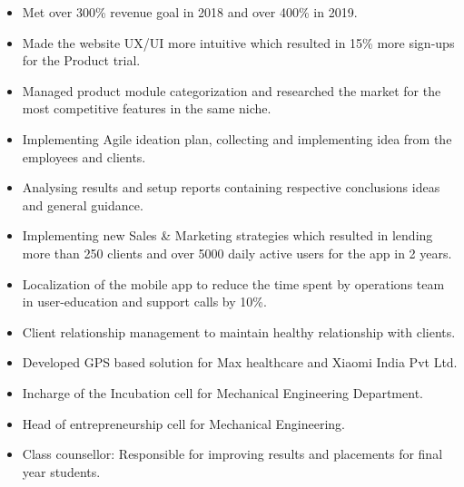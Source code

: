 \documentclass[10pt,a4paper]{altacv}
\begin{document}
\begin{itemize}
\item Met over 300\% revenue goal in 2018 and over 400\% in 2019. 
\item Made the website UX/UI more intuitive which resulted in 15\% more sign-ups for the Product trial.  
\item Managed product module categorization and researched the market for the most competitive features in the same niche. 
\item Implementing Agile ideation plan, collecting and implementing idea from the employees and clients.
\item Analysing results and setup reports containing respective conclusions ideas and general guidance.
\item Implementing new Sales \& Marketing strategies which resulted in lending more than 250 clients and over 5000 daily active users for the app in 2 years.
\item Localization of the mobile app to reduce the time spent by operations team in user-education and support calls by 10\%.
\item Client relationship management to maintain healthy relationship with clients.
\item Developed GPS based solution for Max healthcare and Xiaomi India Pvt Ltd.
\end{itemize}
\divider
{}
\begin{itemize}
\item Incharge of the Incubation cell for Mechanical Engineering Department. 
\item Head of entrepreneurship cell for Mechanical Engineering.  
\item Class counsellor: Responsible for improving results and placements for final year students. 
\end{itemize}
\divider



\divider



\medskip
\end{document}
